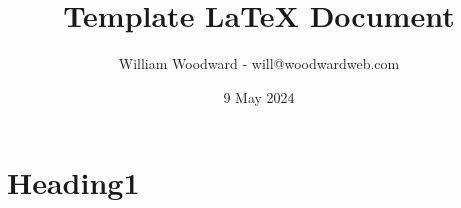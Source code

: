 \documentclass[10pt]{article}
\title{Template LaTeX Document}
\date{9 May 2024}
\author{
William Woodward - will@woodwardweb.com
}
\begin{document}
\maketitle

\pagebreak
\tableofcontents

\pagebreak

\section{Heading1}




\end{document}
